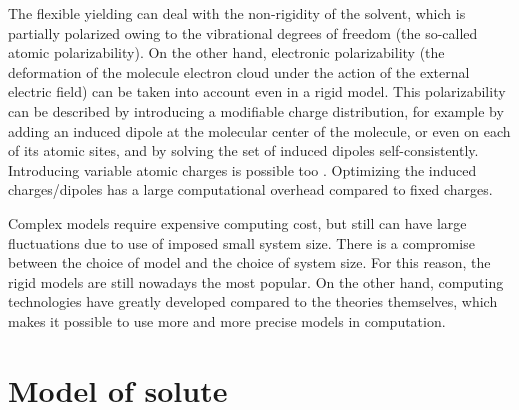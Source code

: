 The flexible yielding can deal with the non-rigidity of the solvent,
which is partially polarized owing to the vibrational degrees of freedom
(the so-called atomic polarizability). On the other hand, electronic
polarizability (the deformation of the molecule electron cloud under
the action of the external electric field) can be taken into account
even in a rigid model. This polarizability can be described by introducing
a modifiable charge distribution, for example by adding an induced
dipole at the molecular center of the molecule, or even on each of
its atomic sites, and by solving the set of induced dipoles self-consistently.
Introducing variable atomic charges is possible too \citep{Berne_1994}.
Optimizing the induced charges/dipoles has a large computational overhead
compared to fixed charges.

Complex models require expensive computing cost, but still can have
large fluctuations due to use of imposed small system size. There
is a compromise between the choice of model and the choice of system
size. For this reason, the rigid models are still nowadays the most
popular. On the other hand, computing technologies have greatly developed
compared to the theories themselves, which makes it possible to use
more and more precise models in computation. 

\section{Model of solute}

